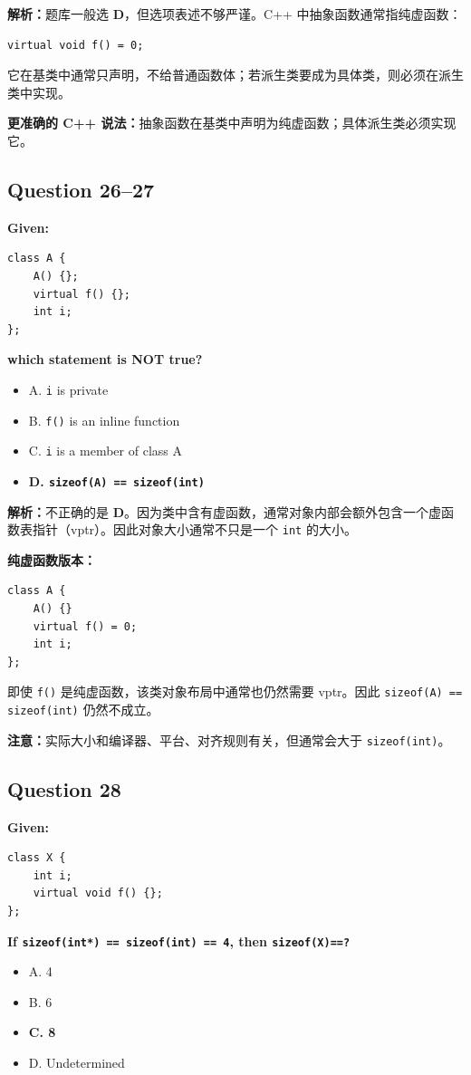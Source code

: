 \documentclass[11pt, a4paper]{article}
\begin{document}
\textbf{解析：}题库一般选 \textbf{D}，但选项表述不够严谨。C++ 中抽象函数通常指纯虚函数：
\begin{lstlisting}
virtual void f() = 0;
\end{lstlisting}
它在基类中通常只声明，不给普通函数体；若派生类要成为具体类，则必须在派生类中实现。

\textbf{更准确的 C++ 说法：}抽象函数在基类中声明为纯虚函数；具体派生类必须实现它。


\subsection*{Question 26--27}
\textbf{Given:}
\begin{lstlisting}
class A {
    A() {};
    virtual f() {};
    int i;
};
\end{lstlisting}
\textbf{which statement is NOT true?}

\begin{itemize}
    \item A. \texttt{i} is private
    \item B. \texttt{f()} is an inline function
    \item C. \texttt{i} is a member of class A
    \item \textbf{D. \texttt{sizeof(A) == sizeof(int)}}
\end{itemize}

\textbf{解析：}不正确的是 \textbf{D}。因为类中含有虚函数，通常对象内部会额外包含一个虚函数表指针（vptr）。因此对象大小通常不只是一个 \texttt{int} 的大小。

\bigskip

\textbf{纯虚函数版本：}
\begin{lstlisting}
class A {
    A() {}
    virtual f() = 0;
    int i;
};
\end{lstlisting}
即使 \texttt{f()} 是纯虚函数，该类对象布局中通常也仍然需要 vptr。因此 \texttt{sizeof(A) == sizeof(int)} 仍然不成立。

\textbf{注意：}实际大小和编译器、平台、对齐规则有关，但通常会大于 \texttt{sizeof(int)}。


\subsection*{Question 28}
\textbf{Given:}
\begin{lstlisting}
class X {
    int i;
    virtual void f() {};
};
\end{lstlisting}
\textbf{If \texttt{sizeof(int*) == sizeof(int) == 4}, then \texttt{sizeof(X)==?}}
\begin{itemize}
    \item A. 4
    \item B. 6
    \item \textbf{C. 8}
    \item D. Undetermined
\end{itemize}
\end{document}

